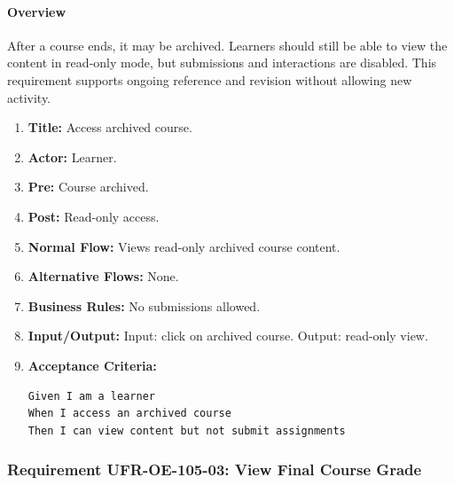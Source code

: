 \paragraph{Overview}
After a course ends, it may be archived. Learners should still be able to view the content in read‑only mode, but submissions and interactions are disabled. This requirement supports ongoing reference and revision without allowing new activity.
\begin{enumerate}[label=\textbf{\arabic*.}]
\item \textbf{Title:} Access archived course.
\item \textbf{Actor:} Learner.
\item \textbf{Pre:} Course archived.
\item \textbf{Post:} Read-only access.
\item \textbf{Normal Flow:} Views read‑only archived course content.
\item \textbf{Alternative Flows:} None.
\item \textbf{Business Rules:} No submissions allowed.
\item \textbf{Input/Output:} Input: click on archived course. Output: read-only view.
\item \textbf{Acceptance Criteria:}
    \begin{verbatim}
Given I am a learner
When I access an archived course
Then I can view content but not submit assignments
    \end{verbatim}
\end{enumerate}

\subsubsection{Requirement UFR-OE-105-03: View Final Course Grade}
